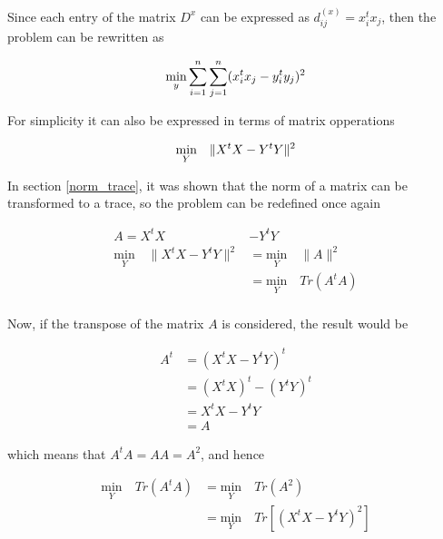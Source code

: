 \documentclass[12pt,journal]{IEEEtran}
\begin{document}
    Since each entry of the matrix $D^x$ can be expressed as
    $d_{ij}^{(x)} = x_i^t x_j$, then the problem can be rewritten as

    \begin{equation*}
        \underset{y}{\text{min}} \sum_{i=1}^n \sum_{j=1}^n ( x_i^t x_j - y_i^t y_j )^2 \\
    \end{equation*}

    For simplicity it can also be expressed in terms of matrix opperations

    \begin{equation*}
        \underset{Y}{\text{min}} \quad \lVert X^t X - Y^t Y \rVert^2 \\
    \end{equation*}

    In section \ref{norm_trace}, it was shown that the norm of a matrix can be
    transformed to a trace, so the problem can be redefined once again

    \begin{equation*}
        \begin{aligned}
            A = X^tX &- Y^tY\\
            \underset{Y}{\text{min}} \quad \lVert X^t X - Y^t Y \rVert^2
            &=
            \underset{Y}{\text{min}} \quad \lVert A \rVert^2\\
            &=
            \underset{Y}{\text{min}} \quad Tr(A^tA) \\
        \end{aligned}
    \end{equation*}

    Now, if the transpose of the matrix $A$ is considered, the result would be

    \begin{equation*}
        \begin{aligned}
            A^t &= (X^tX - Y^tY)^t\\
                &= (X^tX)^t - (Y^tY)^t\\
                &= X^tX - Y^tY\\
                &= A
        \end{aligned}
    \end{equation*}

    which means that $A^tA = AA = A^2$, and hence

    \begin{equation*}
        \begin{aligned}
            \underset{Y}{\text{min}} \quad Tr(A^tA)
            &=
            \underset{Y}{\text{min}} \quad Tr(A^2)\\
            &=
            \underset{Y}{\text{min}} \quad Tr[(X^tX - Y^tY)^2]
        \end{aligned}
    \end{equation*}
\end{document}
